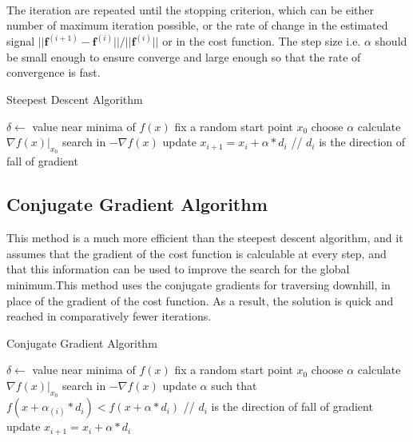 \documentclass[a4paper]{book}
\begin{document}
\paragraph*{}The iteration are repeated until the stopping criterion, which can be either number of maximum iteration possible, or the rate of change in the estimated signal $ ||\textbf{f}^{(i+1)} - \textbf{f}^{(i)}||/||\textbf{f}^{(i)}||$ or in the cost function. The step size i.e. $ \alpha $ should be small enough to ensure converge and large enough so that the rate of convergence is fast.
\begin{algorithm}[h!]
	\caption{Steepest Descent Algorithm}
	\label{alg1}
	\begin{algorithmic}
		\STATE $ \delta \leftarrow$ value near minima of  $f(x) $ 
		\STATE fix a random start point  $ x_{0} $
		\STATE choose  $ \alpha $ 
		\STATE	calculate $ \nabla f(x) |_{x_{0}}$
		\STATE search in $ - \nabla f(x)$
		\STATE update $ x_{i+1} = x_{i} + \alpha*d_{i} $  // $ d_{i} $  is the direction of fall of gradient
		\ENDIF
		\end{algorithmic}
	
\end{algorithm}



\subsection{Conjugate Gradient Algorithm}
This method is a much more efficient than the steepest descent algorithm,
and it assumes that the gradient of the cost function is calculable at every step, and that this information can be used to improve the search for the global minimum.This method uses the conjugate gradients for traversing
downhill, in place of the gradient of the cost function. As a result, the solution is quick and reached in comparatively fewer iterations.\cite{Fletcher00opt}
\begin{algorithm}[h!]
	\caption{Conjugate Gradient Algorithm}
	\label{alg2}
	\begin{algorithmic}
		\STATE $ \delta \leftarrow$ value near minima of  $f(x) $ 
		\STATE fix a random start point  $ x_{0} $
		\STATE choose  $ \alpha $ 
		\IF {$ f(x) \geq \delta $}
		\STATE	calculate $ \nabla f(x) |_{x_{0}}$
		\STATE search in $ - \nabla f(x)$
		\STATE update $ \alpha $ such that $ f(x + \alpha_{(i)}*d_{i}) < f(x + \alpha*d_{i})$  // $ d_{i} $  is the direction of fall of gradient
		\STATE update $ x_{i+1} = x_{i} + \alpha*d_{i} $  
		\ENDIF
	\end{algorithmic}
	
\end{algorithm}
\end{document}

